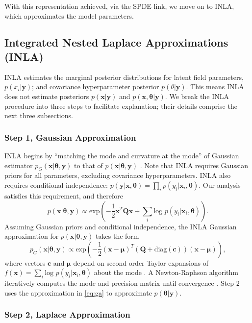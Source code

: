 With this representation achieved, via the SPDE link, we move on to INLA, which approximates the model parameters.

\subsection{Integrated Nested Laplace Approximations (INLA)}

INLA estimates the marginal posterior distributions for latent field parameters, $p(x_{i}|\pmb{y})$; and covariance hyperparameter posterior $p(\theta|\pmb{y})$. This means INLA does not estimate posteriors $p(\pmb{x}|\pmb{y})$ and $p(\pmb{x},\pmb{\theta}|\pmb{y})$. We break the INLA procedure into three steps to facilitate explanation; their details comprise the next three subsections.

\subsubsection{Step 1, Gaussian Approximation} %

INLA begins by ``matching the mode and curvature at the mode'' of Gaussian estimator $p_{G}(\pmb{x}|\pmb{\theta}, \pmb{y})$ to that of $p(\pmb{x}|\pmb{\theta}, \pmb{y})$ \citep{Rue2005}. Note that INLA requires Gaussian priors for all parameters, excluding covariance hyperparameters. INLA also requires conditional independence: $p(\pmb{y}|\pmb{x}, \pmb{\theta}) = \prod_{i} p(y_{i}|\pmb{x}_{i},\pmb{\theta})$. Our analysis satisfies this requirement, and therefore $$p(\pmb{x}|\pmb{\theta},\pmb{y}) \propto \text{exp}\left(-\frac{1}{2}\pmb{x}^{T}\pmb{Q x} + \sum_{i} \text{log }p(y_{i}|\pmb{x}_{i},\pmb{\theta}) \right).$$ Assuming Gaussian priors and conditional independence, the INLA Gaussian approximation for $p(\pmb{x}|\pmb{\theta}, \pmb{y})$ takes the form
\begin{equation} \label{eq:ga}
p_{G}(\pmb{x}|\pmb{\theta},\pmb{y}) \propto \text{exp} \left( -\frac{1}{2}(\pmb{x-\mu})^{T} (\pmb{Q} + \text{diag}(\pmb{c}) ) (\pmb{x - \mu}) \right),
\end{equation}
where vectors $\pmb{c}$ and $\pmb{\mu}$ depend on second order Taylor expansions of $f(\pmb{x}) = \sum_{i} \text{log }p(y_{i}|\pmb{x}_{i},\pmb{\theta})$ about the mode \citep{Lindstrom2014}. A Newton-Raphson algorithm iteratively computes the mode and precision matrix until convergence \citep{Rue2009}. Step 2 uses the approximation in \ref{eq:ga} to approximate $p(\pmb{\theta}|\pmb{y})$.

\subsubsection{Step 2, Laplace Approximation}  %

